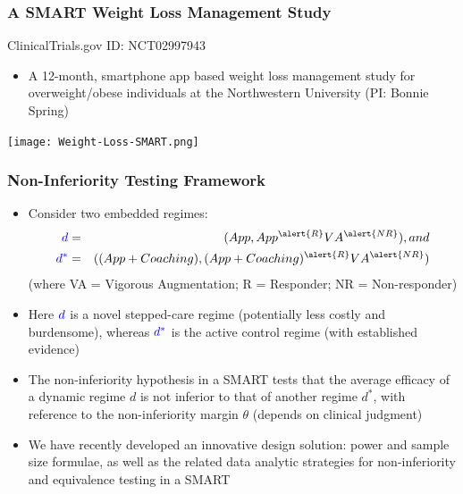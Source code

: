 \documentclass[10pt,xcolor=dvipsnames]{beamer}
\begin{document}
\begin{frame}
\frametitle{A SMART Weight Loss Management Study}
\begin{center}
{\color{blue}ClinicalTrials.gov ID: NCT02997943} 
\end{center}
\begin{itemize}
\item A 12-month, smartphone app based weight loss management study for overweight/obese individuals at the Northwestern University (\alert{PI: Bonnie Spring})
\end{itemize}
\begin{center}
\texttt{[image: Weight-Loss-SMART.png]}
\end{center}
\end{frame}




\begin{frame}[plain]
\frametitle{Non-Inferiority Testing Framework}
\begin{itemize}
\item Consider two embedded regimes: 
\begin{eqnarray*}
{\color{blue}d} &=& (App, App^{\alert{R}}VA^{\alert{NR}}), and \\
{\color{blue}d^*} &=& ((App+Coaching), (App+Coaching)^{\alert{R}} VA^{\alert{NR}})
\end{eqnarray*}
(where VA = Vigorous Augmentation; R = Responder; NR = Non-responder) 
\bigskip
\item Here ${\color{blue}d}$ is a novel stepped-care regime (potentially less costly and burdensome), whereas ${\color{blue}d^*}$ is the active control regime (with established evidence)
\bigskip
\item The non-inferiority hypothesis in a SMART tests that the \alert{average efficacy} of a dynamic regime {\color{blue}$d$} is \alert{not inferior} to that of another regime {\color{blue}$d^*$}, with reference to the non-inferiority margin {\color{blue}$\theta$} (depends on \alert{clinical} judgment)
\vspace{0.25cm}
\item We have recently developed an \alert{innovative design solution}: power and sample size formulae, as well as the related data analytic strategies for non-inferiority and equivalence testing in a SMART

\end{itemize}
\end{frame}
\end{document}
